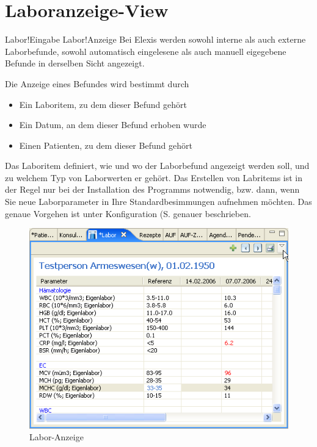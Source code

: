 
\section{Laboranzeige-View}
\index Labor!Eingabe
\index Labor!Anzeige
Bei Elexis werden sowohl interne als auch externe Laborbefunde, sowohl
automatisch eingelesene als auch manuell eigegebene Befunde in derselben Sicht
angezeigt.

Die  Anzeige eines Befundes wird bestimmt durch
\begin{itemize}
  \item Ein Laboritem, zu dem dieser Befund gehört
  \item Ein Datum, an dem dieser Befund erhoben wurde
  \item Einen Patienten, zu dem dieser Befund gehört
\end{itemize}

Das Laboritem definiert, wie und wo der Laborbefund angezeigt werden soll, und
zu welchem Typ von Laborwerten er gehört. Das Erstellen von Labritems ist in der Regel nur bei der Installation des
Programms notwendig, bzw. dann, wenn Sie neue Laborparameter in Ihre
Standardbesimmungen aufnehmen möchten. Das genaue Vorgehen ist unter Konfiguration (S. \pageref{config:labor} genauer beschrieben.

\begin{figure}[htp]
\begin{center}
  \includegraphics{images/labview}
  \caption{Labor-Anzeige}
  \label{fig:labview}
\end{center}
\end{figure}

